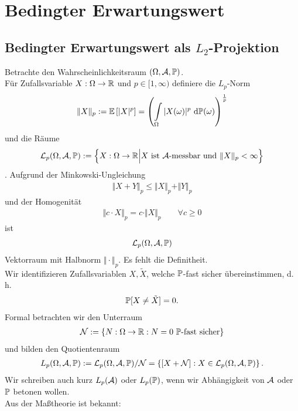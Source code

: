 \chapter{Bedingter Erwartungswert}
\section{Bedingter Erwartungswert als $L_2$-Projektion}
Betrachte den Wahrscheinlichkeitsraum $(\Omega,\A,\P)$.\\
Für Zufallsvariable $X:\Omega\to\R$ und $p\in[1,\infty)$ definiere die $L_p$-Norm
\begin{align*}
\Vert X\Vert_p:=\E\left[|X|^p\right]=\left(\int\limits_\Omega|X(\omega)|^p\d\P(\omega)\right)^{\frac{1}{p}}
\end{align*}
und die Räume
\begin{align*}
\mathcal{L}_p(\Omega,\A,\P):=\Big\lbrace X:\Omega\to\R\Big|X\text{ ist $\A$-messbar und }\Vert X\Vert_p<\infty\Big\rbrace
\end{align*}.
Aufgrund der Minkowski-Ungleichung
\begin{align*}
\Vert X+Y\Vert_p\leq\Vert X\Vert_p+\Vert Y\Vert_p
\end{align*}
und der Homogenität
\begin{align*}
\Vert c\cdot X\Vert_p=c\cdot\Vert X\Vert_p\qquad\forall c\geq0
\end{align*}
ist 
\begin{align*}
\mathcal{L}_p(\Omega,\A,\P)
\end{align*}
Vektorraum mit Halbnorm $\Vert\cdot\Vert_p$. Es fehlt die Definitheit.\\
Wir identifizieren Zufallsvariablen $X,\tilde{X}$, welche $\P$-fast sicher übereinstimmen, d. h. 
\begin{align*}
\P[X\neq\tilde{X}]=0.
\end{align*}
Formal betrachten wir den Unterraum
\begin{align*}
\mathcal{N}:=\lbrace N:\Omega\to\R:N=0\text{ $\P$-fast sicher}\rbrace
\end{align*}
und bilden den Quotientenraum
\begin{align*}
L_p(\Omega,\A,\P):=\mathcal{L}_p(\Omega,\A,\P)/\mathcal{N}=\left\lbrace[X+\mathcal{N}]:X\in\mathcal{L}_p(\Omega,\A,\P)\right\rbrace.
\end{align*}
Wir schreiben auch kurz $L_p(\A)$ oder $L_p(\P)$, wenn wir Abhängigkeit von $\A$ oder $\P$ betonen wollen.\\
Aus der Maßtheorie ist bekannt:

